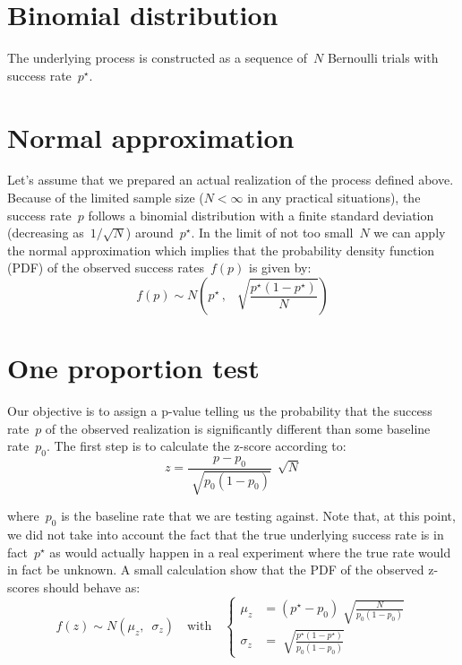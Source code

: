 \documentclass{article}
\begin{document}
\section{Binomial distribution}

The underlying process is constructed as a sequence of~$N$ Bernoulli trials with success rate~$p^{\star}$.

\section{Normal approximation}

Let's assume that we prepared an actual realization of the process defined above. Because of the limited sample size ($N < \infty$ in any practical situations), the success rate~$p$ follows a binomial distribution with a finite standard deviation (decreasing as~$1 / \sqrt{N}$) around~$p^{\star}$.  In the limit of not too small~$N$ we can apply the normal approximation which implies that the probability density function (PDF) of the observed success rates~$f(p)$ is given by:
\begin{equation}
f(p) \sim N \left( p^{\star} \, , \,\,\, \sqrt[]{\frac{p^{\star} (1 - p^{\star})}{N}} \right)
\end{equation}

\section{One proportion test}

Our objective is to assign a p-value telling us the probability that the success rate~$p$ of the observed realization is significantly different than some baseline rate~$p_0$. The first step is to calculate the z-score according to:
\begin{equation}
z = \frac{p - p_0}{\sqrt[]{p_0 (1 - p_0)}} \, \sqrt[]{N}
\end{equation}

\noindent where~$p_0$ is the baseline rate that we are testing against.  Note that, at this point, we did not take into account the fact that the true underlying success rate is in fact~$p^{\star}$ as would actually happen in a real experiment where the true rate would in fact be unknown.  A small calculation show that the PDF of the observed z-scores should behave as:
\begin{equation}
f(z) \sim N \left( \mu_z , \,\,\, \sigma_z \right) \quad \mbox{with} \quad 
\begin{cases}
    \mu_z  & = \left( p^{\star}  - p_0 \right) \sqrt[]{\frac{N}{p_0 (1 - p_0)}} \\
    \sigma_z & = \sqrt[]{\frac{p^{\star} (1 - p^{\star})}{p_0 (1 - p_0) }}
  \end{cases}
\end{equation}
\end{document}

